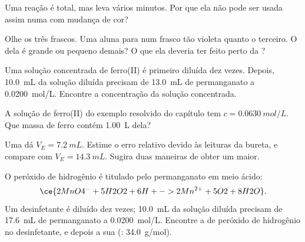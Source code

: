 \begin{exercise}[$\star\star$]\label{exo:g11:titration:8}
Uma reação é total, mas leva vários minutos. Por que ela não pode ser
usada assim numa  com mudança de cor?
\end{exercise}

\begin{exercise}[$\star\star$]\label{exo:g11:titration:9}
Olhe os três frascos. Uma aluna para num frasco tão violeta quanto o
terceiro. O  dela é grande ou pequeno demais? O
que ela deveria ter feito perto da ?
\end{exercise}

\begin{exercise}[$\star\star$]\label{exo:g11:titration:10}
Uma solução concentrada de ferro(II) é primeiro diluída dez vezes.
Depois, \qty{10.0}{mL} da solução diluída precisam de \qty{13.0}{mL} de
permanganato a \qty{0.0200}{mol/L}. Encontre a concentração da solução
concentrada.
\end{exercise}

\begin{exercise}[$\star\star$]\label{exo:g11:titration:11}
A solução de ferro(II) do exemplo resolvido do capítulo tem
$c = \qty{0.0630}{mol/L}$. Que massa de ferro contém \qty{1.00}{L}
dela?
\end{exercise}

\begin{exercise}[$\star\star\star$]\label{exo:g11:titration:12}
Uma  dá $V_E = \qty{7.2}{mL}$. Estime o erro relativo devido às
leituras da bureta, e compare com $V_E = \qty{14.3}{mL}$. Sugira duas
maneiras de obter um  maior.
\end{exercise}

\begin{exercise}[$\star\star\star$]\label{exo:g11:titration:13}
O peróxido de hidrogênio é titulado pelo permanganato em meio ácido:
\[
  \ce{2MnO4^- + 5H2O2 + 6H+ -> 2Mn^{2+} + 5O2 + 8H2O} .
\]
Um desinfetante é diluído dez vezes; \qty{10.0}{mL} da solução diluída
precisam de \qty{17.6}{mL} de permanganato a \qty{0.0200}{mol/L}.
Encontre a  de peróxido de hidrogênio no desinfetante,
e depois a sua  (: \qty{34.0}{g/mol}).
\end{exercise}

